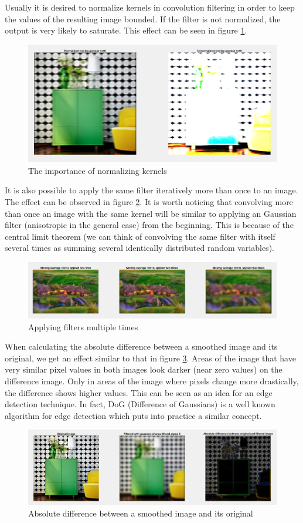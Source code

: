 Usually it is desired to normalize kernels in convolution filtering in order to keep the values of the resulting image bounded. If the filter is not normalized, the output is very likely to saturate. This effect can be seen in figure \ref{fig:task15}.

\begin{figure}[!hbt]
  \includegraphics[width=\textwidth]{./img/task15.png}
  \caption{The importance of normalizing kernels}
  \label{fig:task15}
\end{figure}

It is also possible to apply the same filter iteratively more than once to an image. The effect can be observed in figure \ref{fig:task16}. It is worth noticing that convolving more than once an image with the same kernel will be similar to applying an Gaussian filter (anisotropic in the general case) from the beginning. This is because of the central limit theorem (we can think of convolving the same filter with itself several times as summing several identically distributed random variables).

\begin{figure}[!hbt]
  \includegraphics[width=\textwidth]{./img/task16.png}
  \caption{Applying filters multiple times}
  \label{fig:task16}
\end{figure}

When calculating the absolute difference between a smoothed image and its original, we get an effect similar to that in figure \ref{fig:task17}. Areas of the image that have very similar pixel values in both images look darker (near zero values) on the difference image. Only in areas of the image where pixels change more drastically, the difference shows higher values. This can be seen as an idea for an edge detection technique. In fact, DoG (Difference of Gaussians) is a well known algorithm for edge detection which puts into practice a similar concept.

\begin{figure}[!hbt]
  \includegraphics[width=\textwidth]{./img/task17.png}
  \caption{Absolute difference between a smoothed image and its original}
  \label{fig:task17}
\end{figure}
